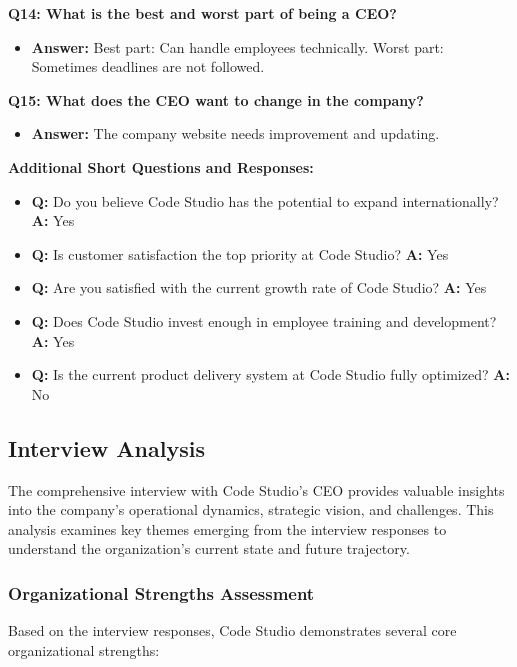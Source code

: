 \documentclass[12pt,a4paper]{article}
\begin{document}
\textbf{Q14: What is the best and worst part of being a CEO?}
\begin{itemize}
    \item \textbf{Answer:} Best part: Can handle employees technically. Worst part: Sometimes deadlines are not followed.
\end{itemize}

\textbf{Q15: What does the CEO want to change in the company?}
\begin{itemize}
    \item \textbf{Answer:} The company website needs improvement and updating.
\end{itemize}

\textbf{Additional Short Questions and Responses:}
\begin{itemize}
    \item \textbf{Q:} Do you believe Code Studio has the potential to expand internationally? \textbf{A:} Yes
    \item \textbf{Q:} Is customer satisfaction the top priority at Code Studio? \textbf{A:} Yes
    \item \textbf{Q:} Are you satisfied with the current growth rate of Code Studio? \textbf{A:} Yes
    \item \textbf{Q:} Does Code Studio invest enough in employee training and development? \textbf{A:} Yes
    \item \textbf{Q:} Is the current product delivery system at Code Studio fully optimized? \textbf{A:} No
\end{itemize}

\subsection{Interview Analysis}

The comprehensive interview with Code Studio's CEO provides valuable insights into the company's operational dynamics, strategic vision, and challenges. This analysis examines key themes emerging from the interview responses to understand the organization's current state and future trajectory.

\subsubsection{Organizational Strengths Assessment}

Based on the interview responses, Code Studio demonstrates several core organizational strengths:
\end{document}
